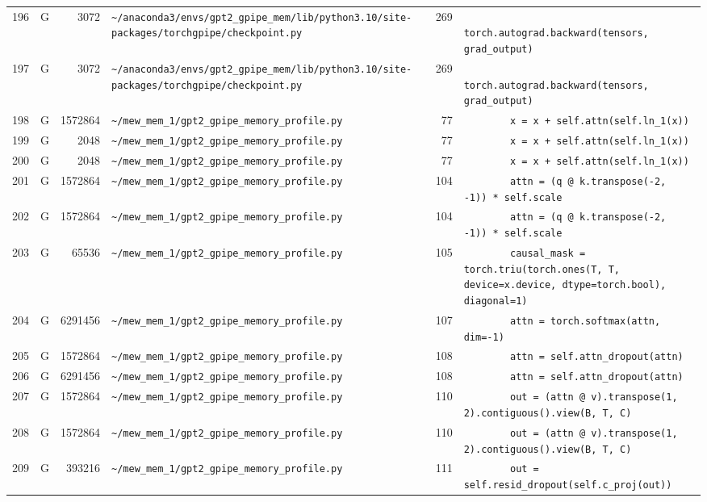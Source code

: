 \documentclass{article}
\begin{document}
\begin{longtable}{r l r p{6.5cm} r p{7.0cm}}
196 & G & 3072 & \lstinline|~/anaconda3/envs/gpt2_gpipe_mem/lib/python3.10/site-packages/torchgpipe/checkpoint.py| & 269 & \lstinline|            torch.autograd.backward(tensors, grad_output)| \\
197 & G & 3072 & \lstinline|~/anaconda3/envs/gpt2_gpipe_mem/lib/python3.10/site-packages/torchgpipe/checkpoint.py| & 269 & \lstinline|            torch.autograd.backward(tensors, grad_output)| \\
198 & G & 1572864 & \lstinline|~/mew_mem_1/gpt2_gpipe_memory_profile.py| & 77 & \lstinline|        x = x + self.attn(self.ln_1(x))| \\
199 & G & 2048 & \lstinline|~/mew_mem_1/gpt2_gpipe_memory_profile.py| & 77 & \lstinline|        x = x + self.attn(self.ln_1(x))| \\
200 & G & 2048 & \lstinline|~/mew_mem_1/gpt2_gpipe_memory_profile.py| & 77 & \lstinline|        x = x + self.attn(self.ln_1(x))| \\
201 & G & 1572864 & \lstinline|~/mew_mem_1/gpt2_gpipe_memory_profile.py| & 104 & \lstinline|        attn = (q @ k.transpose(-2, -1)) * self.scale| \\
202 & G & 1572864 & \lstinline|~/mew_mem_1/gpt2_gpipe_memory_profile.py| & 104 & \lstinline|        attn = (q @ k.transpose(-2, -1)) * self.scale| \\
203 & G & 65536 & \lstinline|~/mew_mem_1/gpt2_gpipe_memory_profile.py| & 105 & \lstinline|        causal_mask = torch.triu(torch.ones(T, T, device=x.device, dtype=torch.bool), diagonal=1)| \\
204 & G & 6291456 & \lstinline|~/mew_mem_1/gpt2_gpipe_memory_profile.py| & 107 & \lstinline|        attn = torch.softmax(attn, dim=-1)| \\
205 & G & 1572864 & \lstinline|~/mew_mem_1/gpt2_gpipe_memory_profile.py| & 108 & \lstinline|        attn = self.attn_dropout(attn)| \\
206 & G & 6291456 & \lstinline|~/mew_mem_1/gpt2_gpipe_memory_profile.py| & 108 & \lstinline|        attn = self.attn_dropout(attn)| \\
207 & G & 1572864 & \lstinline|~/mew_mem_1/gpt2_gpipe_memory_profile.py| & 110 & \lstinline|        out = (attn @ v).transpose(1, 2).contiguous().view(B, T, C)| \\
208 & G & 1572864 & \lstinline|~/mew_mem_1/gpt2_gpipe_memory_profile.py| & 110 & \lstinline|        out = (attn @ v).transpose(1, 2).contiguous().view(B, T, C)| \\
209 & G & 393216 & \lstinline|~/mew_mem_1/gpt2_gpipe_memory_profile.py| & 111 & \lstinline|        out = self.resid_dropout(self.c_proj(out))| \\

\end{longtable}
\end{document}

